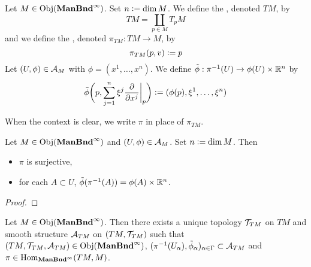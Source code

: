 \documentclass{book}
\begin{document}
\begin{defn}
	Let $M \in \operatorname{Obj}(\operatorname*{\text{\textbf{ManBnd}}^{\infty}})$. Set $n \vcentcolon= \dim M$. We define the , denoted $TM$, by  
	$$TM = \coprod_{p \in M} T_p M $$ 
	and we define the , denoted $\pi_{TM}: TM \rightarrow M$, by 
	$$\pi_{TM}(p, v) \vcentcolon= p$$
	Let $(U, \phi) \in \mathcal{A}_M$ with $\phi = (x^1, \ldots, x^n)$. We define $\tilde{\phi}: \pi^{-1}(U) \rightarrow \phi(U) \times \mathbb{R}^n$ by 
	$$\tilde{\phi} \bigg(p, \sum_{j=1}^n \xi^j \frac{\partial}{\partial x^j} \bigg|_p \bigg) \vcentcolon= (\phi(p), \xi^1, \ldots, \xi^n)$$ 
\end{defn}

\begin{note}
	When the context is clear, we write $\pi$ in place of $\pi_{TM}$.
\end{note}

\begin{ex}
	Let $M \in \operatorname{Obj}(\operatorname*{\text{\textbf{ManBnd}}^{\infty}})$ and $(U, \phi) \in \mathcal{A}_M$. Set $n \vcentcolon= \dim M$. Then
	\begin{itemize}
		\item $\pi$ is surjective,
		\item for each $A \subset U$, $\tilde{\phi}(\pi^{-1}(A)) = \phi(A) \times \mathbb{R}^n$.
	\end{itemize}
\end{ex}

\begin{proof}
\end{proof}


\begin{ex}
	Let $M \in \operatorname{Obj}(\operatorname*{\text{\textbf{ManBnd}}^{\infty}})$. Then there exists a unique topology $\mathcal{T}_{TM}$ on $TM$ and smooth structure $\mathcal{A}_{TM}$ on $(TM, \mathcal{T}_{TM})$ such that $(TM, \mathcal{T}_{TM}, \mathcal{A}_{TM}) \in \operatorname{Obj}(\operatorname*{\text{\textbf{ManBnd}}^{\infty}})$,  $(\pi^{-1}(U_{\alpha}), \tilde{\phi}_{\alpha})_{\alpha \in \Gamma} \subset \mathcal{A}_{TM}$ and $\pi \in \operatorname{Hom}_{\operatorname*{\text{\textbf{ManBnd}}^{\infty}}}(TM, M)$. 
\end{ex}
\end{document}
